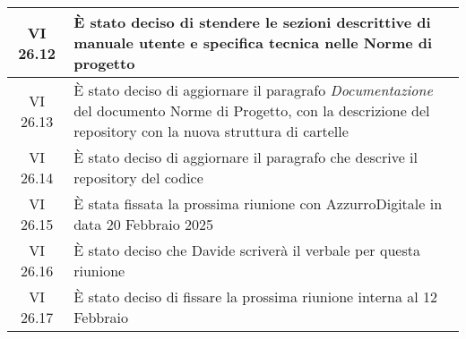 \begin{table}[htbp]
\begin{tabular}{|c|p{}|}
        \hline
        VI 26.12 & È stato deciso di stendere le sezioni descrittive di manuale utente e specifica tecnica nelle Norme di progetto \\
        \hline
        VI 26.13 & È stato deciso di aggiornare il paragrafo \emph{Documentazione} del documento Norme di Progetto, con la descrizione del repository con la nuova struttura di cartelle \\
        \hline
        VI 26.14 & È stato deciso di aggiornare il paragrafo che descrive il repository del codice \\
        \hline
        VI 26.15 & È stata fissata la prossima riunione con AzzurroDigitale in data 20 Febbraio 2025 \\
        \hline
        VI 26.16 & È stato deciso che Davide scriverà il verbale per questa riunione \\
        \hline
        VI 26.17 & È stato deciso di fissare la prossima riunione interna al 12 Febbraio \\
        \hline
    \end{tabular}
\end{table}
